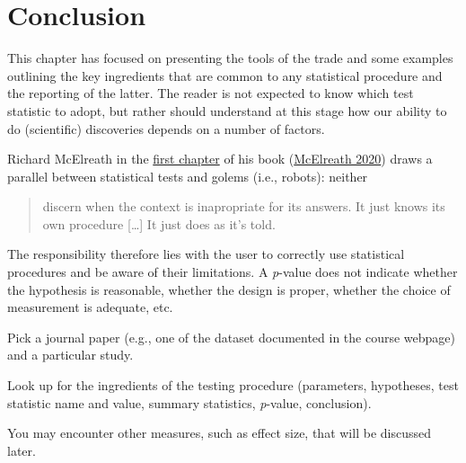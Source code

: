 \documentclass[
  11pt,
  letterpaper,
]{scrbook}
\theoremstyle{definition}
\theoremstyle{remark}
\begin{document}
\hypertarget{conclusion-1}{%
\section{Conclusion}\label{conclusion-1}}

This chapter has focused on presenting the tools of the trade and some
examples outlining the key ingredients that are common to any
statistical procedure and the reporting of the latter. The reader is not
expected to know which test statistic to adopt, but rather should
understand at this stage how our ability to do (scientific) discoveries
depends on a number of factors.

Richard McElreath in the
\href{http://xcelab.net/rmpubs/sr2/statisticalrethinking2_chapters1and2.pdf}{first
chapter} of his book (\protect\hyperlink{ref-McElreath:2020}{McElreath
2020}) draws a parallel between statistical tests and golems (i.e.,
robots): neither

\begin{quote}
discern when the context is inapropriate for its answers. It just knows
its own procedure {[}\ldots{]} It just does as it's told.
\end{quote}

The responsibility therefore lies with the user to correctly use
statistical procedures and be aware of their limitations. A
\emph{p}-value does not indicate whether the hypothesis is reasonable,
whether the design is proper, whether the choice of measurement is
adequate, etc.

\begin{tcolorbox}[enhanced jigsaw, breakable, toptitle=1mm, left=2mm, bottomrule=.15mm, colframe=quarto-callout-tip-color-frame, colback=white, rightrule=.15mm, title=\textcolor{quarto-callout-tip-color}{\faLightbulb}\hspace{0.5em}{Your turn}, opacityback=0, toprule=.15mm, titlerule=0mm, colbacktitle=quarto-callout-tip-color!10!white, bottomtitle=1mm, arc=.35mm, coltitle=black, opacitybacktitle=0.6, leftrule=.75mm]

Pick a journal paper (e.g., one of the dataset documented in the course
webpage) and a particular study.

Look up for the ingredients of the testing procedure (parameters,
hypotheses, test statistic name and value, summary statistics,
\emph{p}-value, conclusion).

You may encounter other measures, such as effect size, that will be
discussed later.

\end{tcolorbox}
\end{document}
